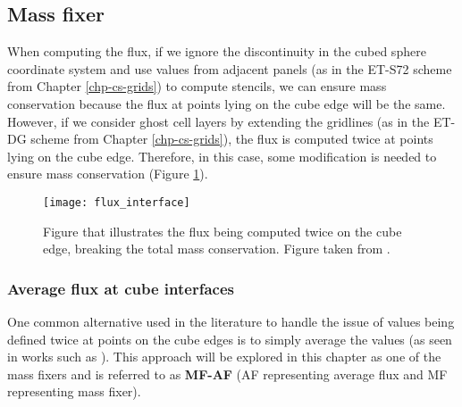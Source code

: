 \subsection{Mass fixer}
\label{mf}
When computing the flux, if we ignore the discontinuity in the cubed sphere coordinate system and use values from adjacent panels
(as in the ET-S72 scheme from Chapter \ref{chp-cs-grids}) to compute stencils, we can ensure mass conservation because the
flux at points lying on the cube edge will be the same.
However, if we consider ghost cell layers by extending the gridlines (as in the ET-DG scheme from Chapter \ref{chp-cs-grids}),
the flux is computed twice at points lying on the cube edge.
Therefore, in this case, some modification is needed to ensure mass conservation (Figure \ref{chp5-fluxcube}).
\begin{figure}[!htb]
	\centering
	\texttt{[image: flux\_interface]}
	\caption{Figure that illustrates the flux being computed twice on
		the cube edge, breaking the total mass conservation.
		Figure taken from \citet{ross:2006}.\label{chp5-fluxcube}}
\end{figure}

\subsubsection{Average flux at cube interfaces}
\label{mf-av}
One common alternative used in the literature to handle the issue of values being defined twice at points on the
cube edges is to simply average the values (as seen in works such as \citet{ross:2006, chen:2008}).
This approach will be explored in this chapter as one of the mass fixers and is referred to as \textbf{MF-AF}
(AF representing average flux and MF representing mass fixer).

